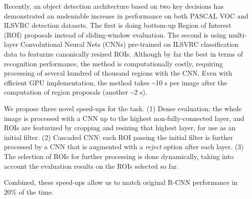 Recently, an object detection architecture based on two key decisions
has demonstrated an undeniable increase in performance on both PASCAL
VOC and ILSVRC detection datasets. The first is doing bottom-up Region
of Interest (ROI) proposals instead of sliding-window evaluation. The
second is using multi-layer Convolutional Neural Nets (CNNs) pre-trained
on ILSVRC classification data to featurize canonically resized ROIs.
Although by far the best in terms of recognition performance, the method
is computationally costly, requiring processing of several hundred of
thousand regions with the CNN. Even with efficient GPU implementation,
the method takes \textasciitilde{}10 s per image after the computation
of region proposals (another \textasciitilde{}2 s).

We propose three novel speed-ups for the task. (1) Dense evaluation: the
whole image is processed with a CNN up to the highest
non-fully-connected layer, and ROIs are featurized by cropping and
resizing that highest layer, for use as an initial filter. (2) Cascaded
CNN: each ROI passing the initial filter is further processed by a CNN
that is augmented with a \emph{reject} option after each layer. (3) The
selection of ROIs for further processing is done dynamically, taking
into account the evaluation results on the ROIs selected so far.

Combined, these speed-ups allow us to match original R-CNN performance
in 20\% of the time.
